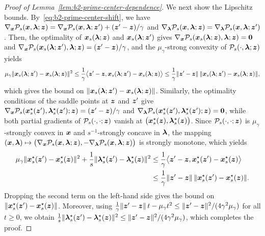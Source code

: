 \begin{proof}[Proof of Lemma~\ref{lem:b2-prime-center-dependence}]
We next show the Lipschitz bounds. By~\eqref{eq:b2-prime-center-shift}, we
have \(\nabla_{\bm{x}}\mathcal P_s(\bm{x},\bm{\lambda};\bm{z})
=\nabla_{\bm{x}}\mathcal P_s(\bm{x},\bm{\lambda};\bm{z}')+(\bm{z}'-\bm{z})/\gamma\) and
\(\nabla_{\bm{\lambda}}\mathcal P_s(\bm{x},\bm{\lambda};\bm{z})
=\nabla_{\bm{\lambda}}\mathcal P_s(\bm{x},\bm{\lambda};\bm{z}')\). Then, the optimality of
\(\bm{x}_s(\bm{\lambda};\bm{z})\) and \(\bm{x}_s(\bm{\lambda};\bm{z}')\) gives
\(\nabla_{\bm{x}}\mathcal P_s(\bm{x}_s(\bm{\lambda};\bm{z}),\bm{\lambda};\bm{z})=\bm{0}\) and
\(\nabla_{\bm{x}}\mathcal P_s(\bm{x}_s(\bm{\lambda};\bm{z}'),\bm{\lambda};\bm{z})=(\bm{z}'-\bm{z})/\gamma\),
and the \(\mu_\gamma\)-strong convexity of \(\mathcal P_s(\cdot,\bm{\lambda};\bm{z})\)
yields
\[
    \mu_\gamma\|\bm{x}_s(\bm{\lambda};\bm{z}')-\bm{x}_s(\bm{\lambda};\bm{z})\|^2
    \le\frac1\gamma\bigl\langle\bm{z}'-\bm{z},
    \bm{x}_s(\bm{\lambda};\bm{z}')-\bm{x}_s(\bm{\lambda};\bm{z})\bigr\rangle
    \le\frac1\gamma\|\bm{z}'-\bm{z}\|\,\|\bm{x}_s(\bm{\lambda};\bm{z}')-\bm{x}_s(\bm{\lambda};\bm{z})\|,
\]
which gives the bound on \(\|\bm{x}_s(\bm{\lambda};\bm{z}')-\bm{x}_s(\bm{\lambda};\bm{z})\|\).
Similarly, the optimality conditions of the saddle points at \(\bm{z}\) and
\(\bm{z}'\) give
\(\nabla_{\bm{x}}\mathcal P_s(\bm{x}_s^\star(\bm{z}'),\bm{\lambda}_s^\star(\bm{z}');\bm{z})
=(\bm{z}'-\bm{z})/\gamma\) and
\(\nabla_{\bm{\lambda}}\mathcal P_s(\bm{x}_s^\star(\bm{z}'),\bm{\lambda}_s^\star(\bm{z}');\bm{z})
=\bm{0}\), while both partial gradients of \(\mathcal P_s(\cdot,\cdot;\bm{z})\)
vanish at \(\bigl(\bm{x}_s^\star(\bm{z}),\bm{\lambda}_s^\star(\bm{z})\bigr)\). Since
\(\mathcal P_s(\cdot,\cdot;\bm{z})\) is \(\mu_\gamma\)-strongly convex in
\(\bm{x}\) and \(s^{-1}\)-strongly concave in \(\bm{\lambda}\), the mapping
\((\bm{x},\bm{\lambda})\mapsto\bigl(\nabla_{\bm{x}}\mathcal P_s(\bm{x},\bm{\lambda};\bm{z}),
-\nabla_{\bm{\lambda}}\mathcal P_s(\bm{x},\bm{\lambda};\bm{z})\bigr)\) is strongly monotone,
which yields
\begin{align*}
    \mu_\gamma\|\bm{x}_s^\star(\bm{z}')-\bm{x}_s^\star(\bm{z})\|^2
    +\frac1s\|\bm{\lambda}_s^\star(\bm{z}')-\bm{\lambda}_s^\star(\bm{z})\|^2
    &\le\frac1\gamma\bigl\langle\bm{z}'-\bm{z},
    \bm{x}_s^\star(\bm{z}')-\bm{x}_s^\star(\bm{z})\bigr\rangle\\
    &\le\frac1\gamma\|\bm{z}'-\bm{z}\|\,\|\bm{x}_s^\star(\bm{z}')-\bm{x}_s^\star(\bm{z})\|.
\end{align*}
Dropping the second term on the left-hand side gives the bound on
\(\|\bm{x}_s^\star(\bm{z}')-\bm{x}_s^\star(\bm{z})\|\). Moreover, using
\(\frac1\gamma\|\bm{z}'-\bm{z}\|\,t-\mu_\gamma t^2
\le\|\bm{z}'-\bm{z}\|^2/(4\gamma^2\mu_\gamma)\) for all \(t\ge0\), we obtain
\(\frac1s\|\bm{\lambda}_s^\star(\bm{z}')-\bm{\lambda}_s^\star(\bm{z})\|^2
\le\|\bm{z}'-\bm{z}\|^2/(4\gamma^2\mu_\gamma)\), which completes the proof.
\end{proof}
